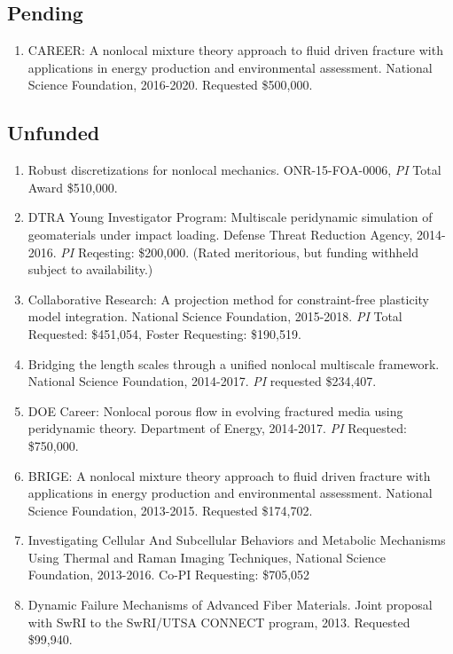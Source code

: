 \subsection*{Pending}

\begin{enumerate}
    \item CAREER: A nonlocal mixture theory approach to fluid driven fracture with applications in energy production and environmental assessment. National Science Foundation, 2016-2020. Requested \$500,000.
\end{enumerate}

\subsection*{Unfunded}

\begin{enumerate}
    \item Robust discretizations for nonlocal mechanics. ONR-15-FOA-0006, \textit{PI} Total Award {\$}510,000.
  \item DTRA Young Investigator Program: Multiscale peridynamic simulation of geomaterials under impact loading. Defense Threat Reduction Agency, 2014-2016. \textit{PI} Reqesting: \$200,000. (Rated meritorious, but funding withheld subject to availability.)
  \item Collaborative Research: A projection method for constraint-free plasticity model integration. National Science Foundation, 2015-2018. \textit{PI} Total Requested: \$451,054, Foster Requesting: \$190,519.
    \item Bridging the length scales through a unified nonlocal multiscale framework. National Science Foundation, 2014-2017. \textit{PI} requested \$234,407.
    \item DOE Career: Nonlocal porous flow in evolving fractured media using peridynamic theory. Department of Energy, 2014-2017. \textit{PI} Requested: \$750,000. 
    \item BRIGE: A nonlocal mixture theory approach to fluid driven fracture with applications in energy production and environmental assessment. National Science Foundation, 2013-2015. Requested \$174,702.
    \item  Investigating Cellular And Subcellular Behaviors and Metabolic Mechanisms Using Thermal and Raman Imaging Techniques, National Science Foundation, 2013-2016.  Co-PI Requesting: \$705,052
    \item Dynamic Failure Mechanisms of Advanced Fiber Materials. Joint proposal with SwRI to the SwRI/UTSA CONNECT program, 2013. Requested \$99,940.

\end{enumerate}
